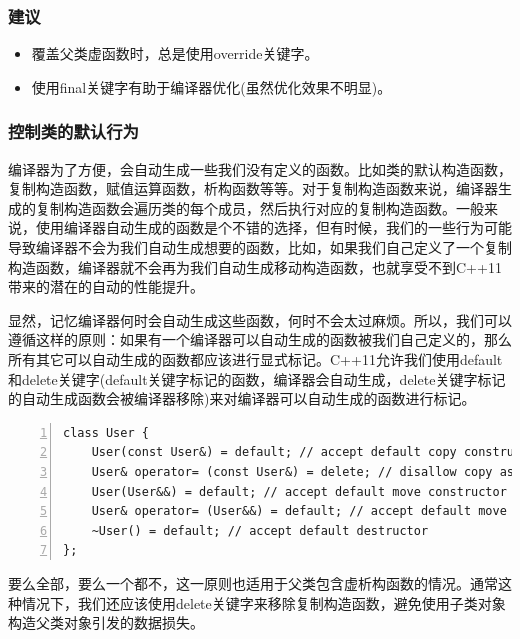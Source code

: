 \documentclass{ctexart}
\begin{document}
\subsubsection*{建议}

\begin{itemize}
	\item 覆盖父类虚函数时，总是使用override关键字。
	\item 使用final关键字有助于编译器优化(虽然优化效果不明显)。
\end{itemize}

\subsubsection{控制类的默认行为}

编译器为了方便，会自动生成一些我们没有定义的函数。比如类的默认构造函数，复制构造函数，赋值运算函数，析构函数等等。对于复制构造函数来说，编译器生成的复制构造函数会遍历类的每个成员，然后执行对应的复制构造函数。一般来说，使用编译器自动生成的函数是个不错的选择，但有时候，我们的一些行为可能导致编译器不会为我们自动生成想要的函数，比如，如果我们自己定义了一个复制构造函数，编译器就不会再为我们自动生成移动构造函数，也就享受不到C++11带来的潜在的自动的性能提升。

显然，记忆编译器何时会自动生成这些函数，何时不会太过麻烦。所以，我们可以遵循这样的原则：如果有一个编译器可以自动生成的函数被我们自己定义的，那么所有其它可以自动生成的函数都应该进行显式标记。C++11允许我们使用default和delete关键字(default关键字标记的函数，编译器会自动生成，delete关键字标记的自动生成函数会被编译器移除)来对编译器可以自动生成的函数进行标记。

\begin{lstlisting}[language={[ANSI]C},keywordstyle=\color{blue!70},commentstyle=\color{red!50!green!50!blue!50},frame=shadowbox, rulesepcolor=\color{red!20!green!20!blue!20},basicstyle=\small,numbers=left, numberstyle=\tiny,breaklines=true]
class User {  
	User(const User&) = default; // accept default copy construction  
	User& operator= (const User&) = delete; // disallow copy assignment  
	User(User&&) = default; // accept default move constructor  
	User& operator= (User&&) = default; // accept default move assignment  
	~User() = default; // accept default destructor  
};
\end{lstlisting}

要么全部，要么一个都不，这一原则也适用于父类包含虚析构函数的情况。通常这种情况下，我们还应该使用delete关键字来移除复制构造函数，避免使用子类对象构造父类对象引发的数据损失。
\end{document}
